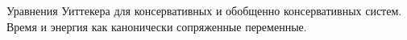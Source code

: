 


Уравнения Уиттекера для консервативных и обобщенно консервативных систем. Время и энергия как канонически сопряженные переменные.



% 


